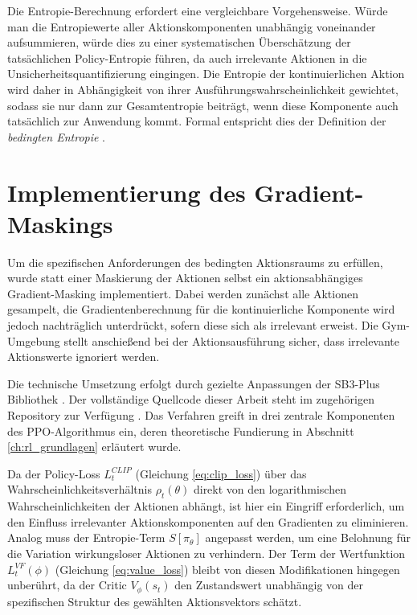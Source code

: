 Die Entropie-Berechnung erfordert eine vergleichbare Vorgehensweise. Würde man die Entropiewerte aller Aktionskomponenten unabhängig voneinander aufsummieren, würde dies zu einer systematischen Überschätzung der tatsächlichen Policy\hyp{}Entropie führen, da auch irrelevante Aktionen in die Unsicherheitsquantifizierung eingingen. Die Entropie der kontinuierlichen Aktion wird daher in Abhängigkeit von ihrer Ausführungswahrscheinlichkeit gewichtet, sodass sie nur dann zur Gesamtentropie beiträgt, wenn diese Komponente auch tatsächlich zur Anwendung kommt. Formal entspricht dies der Definition der \textit{bedingten Entropie} \cite[Kap. 2.2]{bedinteEndropie}.

\section{Implementierung des Gradient-Maskings}
\label{sc:ppo_anpassung}
Um die spezifischen Anforderungen des bedingten Aktionsraums zu erfüllen, wurde statt einer Maskierung der Aktionen selbst ein aktionsabhängiges Gradient\hyp{}Masking implementiert. Dabei werden zunächst alle Aktionen gesampelt, die Gradientenberechnung für die kontinuierliche Komponente wird jedoch nachträglich unterdrückt, sofern diese sich als irrelevant erweist. Die Gym-Umgebung stellt anschießend bei der Aktionsausführung sicher, dass irrelevante Aktionswerte ignoriert werden.
\medskip

Die technische Umsetzung erfolgt durch gezielte Anpassungen der \ac{SB3}\hyp{}Plus Bibliothek \cite{sb3_plus}. Der vollständige Quellcode dieser Arbeit steht im zugehörigen Repository zur Verfügung \cite{meinCode}.
Das Verfahren greift in drei zentrale Komponenten des \ac{PPO}\hyp{}Algorithmus ein, deren theoretische Fundierung in Abschnitt \ref{ch:rl_grundlagen} erläutert wurde.
\medskip

Da der Policy\hyp{}Loss $L_t^{CLIP}$ (Gleichung \ref{eq:clip_loss}) über das Wahrscheinlichkeitsverhältnis $\rho_t(\theta)$  direkt von den logarithmischen Wahrscheinlichkeiten der Aktionen abhängt, ist hier ein Eingriff erforderlich, um den Einfluss irrelevanter Aktionskomponenten auf den Gradienten zu eliminieren. Analog muss der Entropie\hyp{}Term $S[\pi_\theta]$ angepasst werden, um eine Belohnung für die Variation wirkungsloser Aktionen zu verhindern. Der Term der Wertfunktion $L_t^{VF}(\phi)$ (Gleichung \ref{eq:value_loss}) bleibt von diesen Modifikationen hingegen unberührt, da der Critic $V_\phi(s_t)$ den Zustandswert unabhängig von der spezifischen Struktur des gewählten Aktionsvektors schätzt.
\medskip

